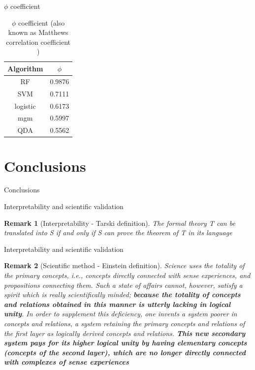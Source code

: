 \documentclass{beamer}
\newtheorem*{remark}{Remark}
\begin{document}
\begin{frame}{$\phi$ coefficient}
\begin{table}[]
\caption{$\phi$ coefficient (also known as Matthews correlation coefficient )}
\begin{center}
\begin{tabular}{c|c}
Algorithm & $\phi$ \\ \hline
RF        & 0.9876 \\ \hline
SVM       & 0.7111 \\ \hline
logistic  & 0.6173 \\ \hline
mgm       & 0.5997 \\ \hline
QDA       & 0.5562 
\end{tabular}
\end{center}
\label{phi_values}
\end{table}
\end{frame}

\section{Conclusions}

\begin{frame}{}
\begin{center}
{\Huge Conclusions}
\end{center}
\end{frame}

\begin{frame}{Interpretability and scientific validation}

\begin{remark}[Interpretability - Tarski definition]
The formal theory T can be translated into S if and only if S can prove the theorem of T in its language \cite{tarski1953undecidable}
\end{remark}

\end{frame}

\begin{frame}{Interpretability and scientific validation}

\begin{remark}[Scientific method - Einstein definition]
Science uses the totality of the primary concepts, i.e., concepts directly connected with sense experiences, and propositions connecting them. Such a state of affairs cannot, however, satisfy a spirit which is really scientifically minded;\textbf{ because the totality of concepts and relations obtained in this manner is utterly lacking in logical unity}. In order to supplement this deficiency, one invents a system poorer in concepts and relations, a system retaining the primary concepts and relations of the \textit{first layer} as logically derived concepts and relations. \textbf{This new \textit{secondary system} pays for its higher logical unity by having elementary concepts (concepts of the second layer), which are no longer directly connected with complexes of sense experiences} \cite{physics-reality}
\end{remark}

\end{frame}
\end{document}
